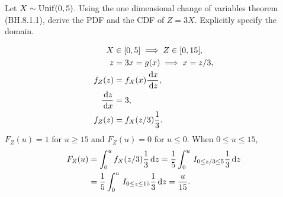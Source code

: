 \documentclass[assignments]{subfiles}
\begin{document}
\begin{exercise}
Let $X \sim \mathrm{Unif}(0, 5)$. Using the one dimensional change of variables theorem (BH.8.1.1),  derive the PDF and the CDF of $Z=3X$. Explicitly specify the domain.
\begin{solution}
  \begin{align}
X &\in [0, 5]  \implies Z \in [0, 15],\\
z &= 3x = g(x) \implies x = z/3, \\
f_{Z}(z) &= f_{X}(x) \frac{\,\textrm{d}x}{\,\textrm{d}z},\\
\frac{\,\textrm{d}z}{\,\textrm{d}x} &= 3,\\
f_{Z}(z) &= f_{X}(z/3) \frac{1}{3}.
  \end{align}
$F_{Z}(u) = 1$ for $u\geq 15$ and $F_{Z}(u) = 0$ for $u\leq 0$. When $0\leq u \leq 15$,
  \begin{align}
  F_{Z}(u) &= \int_{0}^{u} f_{X}(z/3) \frac{1}{3} \,\textrm{d}z = \frac{1}{5}\int_{0}^{u} \,I_{0\leq  z/3\leq 5}  \frac{1}{3} \,\textrm{d}z \\
&= \frac{1}{5}\int_{0}^{u} \,I_{0\leq z\leq 15}  \frac{1}{3} \,\textrm{d}z = \frac{u}{15}.
  \end{align}
\end{solution}


\end{exercise}
\end{document}
